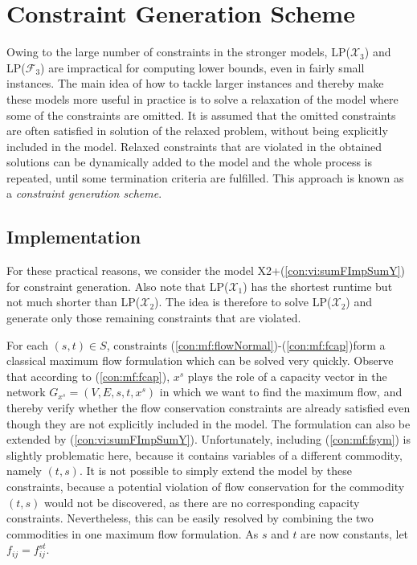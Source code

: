 \section{Constraint Generation Scheme}
\label{sec:cg}
Owing to the large number of constraints in the stronger models, LP($\mathcal{X}_3$) and LP($\mathcal{F}_3$) are impractical for computing lower bounds, even in fairly small instances.
The main idea of how to tackle larger instances and thereby make these models more useful in practice is to solve a relaxation of the model where some of the constraints are omitted.
It is assumed that the omitted constraints are often satisfied in solution of the relaxed problem, without being explicitly included in the model.
Relaxed constraints that are violated in the obtained solutions can be dynamically added to the model and the whole process is repeated, until some termination criteria are fulfilled.
This approach is known as a \emph{constraint generation scheme}.

\subsection{Implementation}%

For these practical reasons, we consider the model X2+(\ref{con:vi:sumFImpSumY}) for constraint generation.
Also note that LP($\mathcal{X}_1$) has the shortest runtime but not much shorter than LP($\mathcal{X}_2$).
The idea is therefore to solve LP($\mathcal{X}_2$) and generate only those remaining constraints that are violated.

For each $(s,t)\in S$, constraints (\ref{con:mf:flowNormal})-(\ref{con:mf:fcap})form a classical maximum flow formulation which can be solved very quickly.
Observe that according to (\ref{con:mf:fcap}), $x^s$ plays the role of a capacity vector in the network $G_{x^s}=(V,E,s,t,x^s)$ in which we want to find the maximum flow, and thereby verify whether the flow conservation constraints are already satisfied even though they are not explicitly included in the model.
The formulation can also be extended by (\ref{con:vi:sumFImpSumY}).
Unfortunately, including (\ref{con:mf:fsym}) is slightly problematic here, because it contains variables of a different commodity, namely $(t,s)$.
It is not possible to simply extend the model by these constraints, because a potential violation of flow conservation for the commodity $(t,s)$ would not be discovered, as there are no corresponding capacity constraints.
Nevertheless, this can be easily resolved by combining the two commodities in one maximum flow formulation.
As $s$ and $t$ are now constants, let $f_{ij}=f^{st}_{ij}$.

